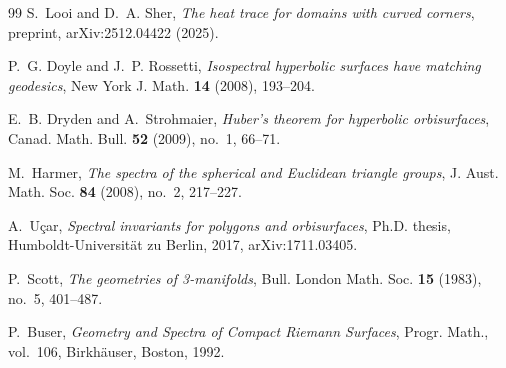 \documentclass[12pt, letterpaper]{article}
\theoremstyle{definition}
\theoremstyle{plain}
\begin{document}
\begin{thebibliography}{99}
S.~Looi and D.~A. Sher, \emph{The heat trace for domains with curved corners}, preprint, arXiv:2512.04422 (2025).

P.~G. Doyle and J.~P. Rossetti, \emph{Isospectral hyperbolic surfaces have matching geodesics}, New York J. Math. \textbf{14} (2008), 193--204.

E.~B. Dryden and A.~Strohmaier, \emph{Huber's theorem for hyperbolic orbisurfaces}, Canad. Math. Bull. \textbf{52} (2009), no.~1, 66--71.

M.~Harmer, \emph{The spectra of the spherical and Euclidean triangle groups}, J. Aust. Math. Soc. \textbf{84} (2008), no.~2, 217--227.

A.~U\c{c}ar, \emph{Spectral invariants for polygons and orbisurfaces}, Ph.D. thesis, Humboldt-Universit\"at zu Berlin, 2017, arXiv:1711.03405.

P.~Scott, \emph{The geometries of 3-manifolds}, Bull. London Math. Soc. \textbf{15} (1983), no.~5, 401--487.

P.~Buser, \emph{Geometry and Spectra of Compact Riemann Surfaces}, Progr. Math., vol.~106, Birkh\"auser, Boston, 1992.

\end{thebibliography}
\end{document}
